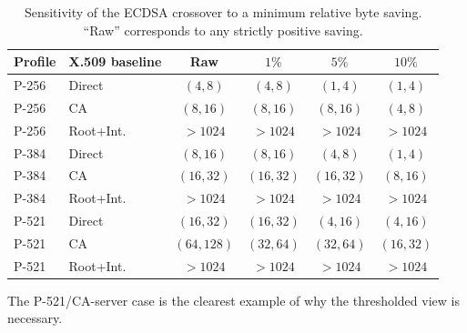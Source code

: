 \documentclass[journal]{IEEEtran}
\begin{document}
\begin{table}[t]

\caption{Sensitivity of the ECDSA crossover to a minimum relative byte saving. ``Raw'' corresponds to any strictly positive saving.}

\label{tab:crossover-sensitivity}

\centering

\begin{tabular}{llcccc}

\toprule

\textbf{Profile} & \textbf{X.509 baseline} & \textbf{Raw} & \textbf{$1\%$} & \textbf{$5\%$} & \textbf{$10\%$} \\

\midrule

P-256 & Direct & $(4,8)$   & $(4,8)$   & $(1,4)$   & $(1,4)$ \\

P-256 & CA     & $(8,16)$  & $(8,16)$  & $(8,16)$  & $(4,8)$ \\

P-256 & Root+Int. & $>1024$ & $>1024$ & $>1024$ & $>1024$ \\

\midrule

P-384 & Direct & $(8,16)$  & $(8,16)$  & $(4,8)$   & $(1,4)$ \\

P-384 & CA     & $(16,32)$ & $(16,32)$ & $(16,32)$ & $(8,16)$ \\

P-384 & Root+Int. & $>1024$ & $>1024$ & $>1024$ & $>1024$ \\

\midrule

P-521 & Direct & $(16,32)$ & $(16,32)$ & $(4,16)$  & $(4,16)$ \\

P-521 & CA     & $(64,128)$& $(32,64)$ & $(32,64)$ & $(16,32)$ \\

P-521 & Root+Int. & $>1024$ & $>1024$ & $>1024$ & $>1024$ \\

\bottomrule

\end{tabular}

\end{table}



The P-521/CA-server case is the clearest example of why the thresholded view is necessary.
\end{document}
